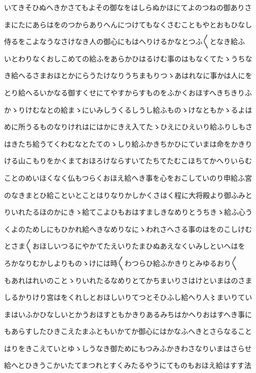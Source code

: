 \documentclass[a4paper,11pt,landscape]{ltjtarticle}
\begin{document}
いてきそひぬへきかさてもよその御なをはしらぬかほにてよのつねの御ありさ
\par\medskip
まにたにあらはをのつからありへんにつけてもなくさむこともやとおもひなし
\par\medskip
侍るをこよなうなさけなき人の御心にもはへりけるかなとつふ〱となき給ふ
\par\medskip
いとわりなくおしこめての給ふをあらかひはるけむ事のはもなくてたゝうちな
\par\medskip
き給へるさまおほとかにらうたけなりうちまもりつゝあはれなに事かは人にを
\par\medskip
とり給へるいかなる御すくせにてやすからすものをふかくおほすへきちきりふ
\par\medskip
かゝりけむなとの給まゝにいみしうくるしうし給ふものゝけなともかゝるよは
\par\medskip
めに所うるものなりけれはにはかにきえ入てたゝひえにひえいり給ふりしもさ
\par\medskip
はきたち給うてくわむなとたてのゝしり給ふかきちかひにていまは命をかきり
\par\medskip
ける山こもりをかくまておほろけならすいてたちてたむこほちてかへりいらむ
\par\medskip
ことのめいほくなく仏もつらくおほえ給へき事を心をおこしていのり申給ふ宮
\par\medskip
のなきまとひ給こといとことはりなりかしかくさはく程に大将殿より御ふみと
\par\medskip
りいれたるほのかにきゝ給てこよひもおはすましきなめりとうちきゝ給ふ心う
\par\medskip
くよのためしにもひかれ給へきなめりなにゝわれさへさる事のはをのこしけむ
\par\medskip
とさま〱おほしいつるにやかてたえいりたまひぬあえなくいみしといへはを
\par\medskip
ろかなりむかしよりものゝけには時〱わつらひ給ふかきりとみゆるおり〱
\par\medskip
もあれはれいのことゝりいれたるなめりとてかちまいりさはけといまはのさま
\par\medskip
しるかりけり宮はをくれしとおほしいりてつとそひふし給へり人〻まいりてい
\par\medskip
まはいふかひなしいとかうおほすともかきりあるみちはかへりおはすへき事に
\par\medskip
もあらすしたひきこえたまふともいかてか御心にはかなふへきとさらなること
\par\medskip
はりをきこえていとゆゝしうなき御ためにもつみふかきわさなりいまはさらせ
\par\medskip
給へとひきうこかいたてまつれとすくみたるやうにてものもおほえ給はすす法
\end{document}
